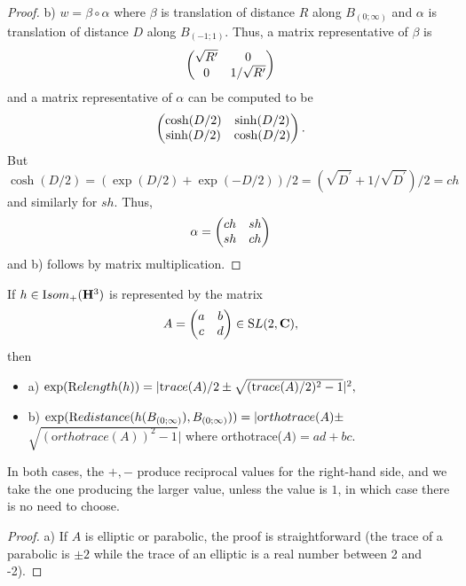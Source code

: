 \begin{remark}
\begin{proof}{}
b)  $w = \beta \circ \alpha$ where $\beta$ is translation of distance $R$ along $ B_{(0;\infty)}$ and $\alpha$ is translation of distance $D$ along $ B_{(-1;1)}$.  Thus,
	a matrix representative of $\beta$ is $$ \left(\begin{matrix}\sqrt{R^\prime} & 0 \cr 0 & 1/\sqrt{R^\prime}\cr\end{matrix}\right)$$ and a matrix representative of $\alpha$ can be computed to be $$\left(\begin{matrix}\cosh(D/2) & \sinh(D/2) \cr \sinh(D/2) & \cosh(D/2)\cr\end{matrix}\right).$$ But
$\cosh(D/2) = (\exp(D/2) + \exp(-D/2))/2 = 
(\sqrt{D^\prime} + 1/\sqrt{D^\prime})/2 = ch$ and similarly for $sh.$
Thus, $$\alpha = \left(\begin{matrix}ch & sh \cr sh & ch\cr\end{matrix}\right)$$ and b) follows by matrix multiplication.
\end{proof}

\begin{lemma}\label{GMT 1.25} If $h \in {\textrm Isom}_+({\mathbf H}^3)$ is represented by the matrix $$A = \left(\begin{matrix}a &  b \cr c & d\cr\end{matrix}\right)\in {\mathrm SL}(2,{\mathbf
C}),$$ then 
\begin{itemize}
\item{a)} $\exp({\textrm Relength} (h))= |{\textrm trace}(A)/2 \pm \sqrt{({\textrm trace}(A)/2)^2 - 1}|^2,$

\item{b)} $\exp({\textrm Redistance} (h(B_{(0;\infty)}), B_{(0;\infty)}))=|{\textrm orthotrace}(A) \pm$\hfill \noindent $\sqrt{({\mathrm
orthotrace}(A))^2 - 1}|$  where 
{\textrm orthotrace(}$A) = ad + bc.$ $\phantom{\sum^\int}$
\end{itemize}
In both cases{\textrm ,} the $+, -$ produce reciprocal values for the right\/{\textrm -}\/hand side{\textrm ,}
  and we take the one producing the larger value{\textrm ,} unless the value is $1${\textrm ,} in
which case there is no need to choose.
\end{lemma}

\begin{proof}{}  a)  If $A$ is elliptic or parabolic, the proof is straightforward (the trace of a parabolic is $\pm 2$ while the trace of an elliptic
is a real number between 2 and -2).  


\end{proof}
\end{remark}
